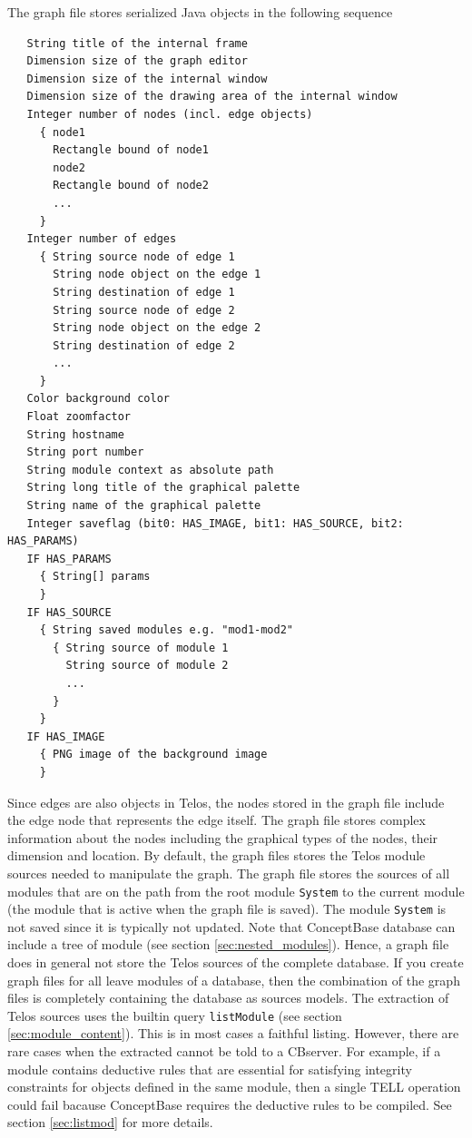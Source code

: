 The graph file stores serialized Java objects in the following sequence
\begin{verbatim}
   String title of the internal frame
   Dimension size of the graph editor
   Dimension size of the internal window
   Dimension size of the drawing area of the internal window
   Integer number of nodes (incl. edge objects)
     { node1
       Rectangle bound of node1
       node2
       Rectangle bound of node2
       ...
     }
   Integer number of edges
     { String source node of edge 1
       String node object on the edge 1 
       String destination of edge 1
       String source node of edge 2
       String node object on the edge 2 
       String destination of edge 2
       ...
     }
   Color background color
   Float zoomfactor
   String hostname
   String port number
   String module context as absolute path
   String long title of the graphical palette 
   String name of the graphical palette
   Integer saveflag (bit0: HAS_IMAGE, bit1: HAS_SOURCE, bit2: HAS_PARAMS)
   IF HAS_PARAMS 
     { String[] params
     }
   IF HAS_SOURCE
     { String saved modules e.g. "mod1-mod2"
       { String source of module 1
         String source of module 2
         ...
       }
     }
   IF HAS_IMAGE 
     { PNG image of the background image
     } 
\end{verbatim}

Since edges are also objects in Telos, the nodes stored in the graph file 
include the edge node that represents the edge itself.
The graph file stores complex information about the nodes including
the graphical types of the nodes, their dimension and location.
By default, the graph files stores the Telos module sources needed to manipulate
the graph. The graph file stores the sources of all modules that are on the path
from the root module {\tt System} to the current module (the module that is active when
the graph file is saved). The module {\tt System} is not saved since it is typically
not updated. Note that ConceptBase database can include a tree of module
(see section \ref{sec:nested_modules}).
Hence, a graph file does in general not store the Telos sources of the complete
database. If you create graph files for all leave modules of a database, then
the combination of the graph files is completely containing the database as sources models.
The extraction of Telos sources uses the builtin query {\tt listModule}
(see section \ref{sec:module_content}). This is in most cases a faithful listing. However,
there are rare cases when the extracted cannot be told to a CBserver.
For example, if a module contains deductive rules that are essential for
satisfying integrity constraints for objects defined in the same module, then
a single TELL operation could fail bacause ConceptBase requires the deductive rules to
be compiled. See section \ref{sec:listmod} for more details.

